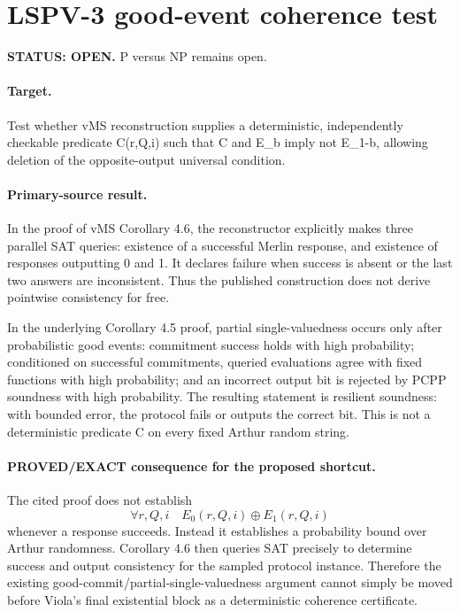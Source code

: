 \documentclass[11pt]{article}
\begin{document}
\section*{LSPV-3 good-event coherence test}
\textbf{STATUS: OPEN.} P versus NP remains open.

\paragraph{Target.} Test whether vMS reconstruction supplies a deterministic, independently checkable predicate C(r,Q,i) such that C and E_b imply not E_{1-b}, allowing deletion of the opposite-output universal condition.

\paragraph{Primary-source result.}
In the proof of vMS Corollary 4.6, the reconstructor explicitly makes three parallel SAT queries: existence of a successful Merlin response, and existence of responses outputting 0 and 1. It declares failure when success is absent or the last two answers are inconsistent. Thus the published construction does not derive pointwise consistency for free.

In the underlying Corollary 4.5 proof, partial single-valuedness occurs only after probabilistic good events: commitment success holds with high probability; conditioned on successful commitments, queried evaluations agree with fixed functions with high probability; and an incorrect output bit is rejected by PCPP soundness with high probability. The resulting statement is resilient soundness: with bounded error, the protocol fails or outputs the correct bit. This is not a deterministic predicate C on every fixed Arthur random string.

\paragraph{PROVED/EXACT consequence for the proposed shortcut.}
The cited proof does not establish
\[
\forall r,Q,i\quad E_0(r,Q,i)\oplus E_1(r,Q,i)
\]
whenever a response succeeds. Instead it establishes a probability bound over Arthur randomness. Corollary 4.6 then queries SAT precisely to determine success and output consistency for the sampled protocol instance. Therefore the existing good-commit/partial-single-valuedness argument cannot simply be moved before Viola's final existential block as a deterministic coherence certificate.
\end{document}
